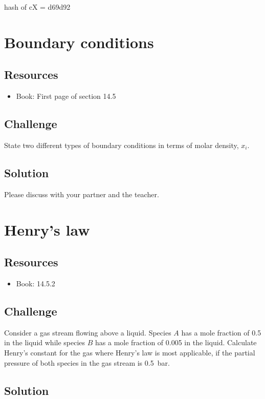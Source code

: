 hash of cX = d69d92




\newpage
\section{Boundary conditions}

\subsection*{Resources}
\begin{itemize}
    \item Book: First page of section 14.5
\end{itemize}

\subsection*{Challenge}
State two different types of boundary conditions in terms of molar density, $x_i$.

\subsection*{Solution}
Please discuss with your partner and the teacher.




\newpage
\section{Henry's law}

\subsection*{Resources}
\begin{itemize}
    \item Book: 14.5.2
\end{itemize}

\subsection*{Challenge}
Consider a gas stream flowing above a liquid. Species $A$ has a mole fraction of \num{0.5} in the liquid while species $B$ has a mole fraction of \num{0.005} in the liquid. Calculate Henry's constant for the gas where Henry's law is most applicable, if the partial pressure of both species in the gas stream is \SI{0.5}{\bar}.

\subsection*{Solution}



